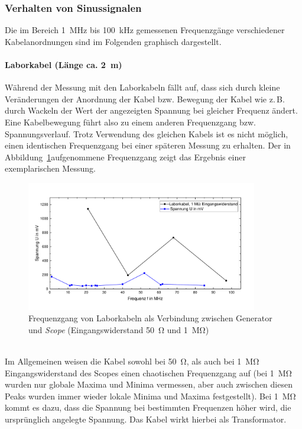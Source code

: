 \documentclass[a4paper,twoside,final]{article}
\begin{document}
\subsubsection{Verhalten von Sinussignalen}
Die im Bereich \SI{1}{\mega\hertz} bis \SI{100}{\kilo\hertz} gemessenen Frequenzgänge verschiedener Kabelanordnungen sind im Folgenden graphisch dargestellt.
\paragraph{Laborkabel (Länge ca. \SI{2}{\metre})}
Während der Messung mit den Laborkabeln fällt auf, dass sich durch kleine Veränderungen der Anordnung der Kabel bzw. Bewegung der Kabel wie z.\,B. durch Wackeln der Wert der angezeigten Spannung bei gleicher Frequenz ändert. Eine Kabelbewegung führt also zu einem anderen Frequenzgang bzw. Spannungsverlauf. Trotz Verwendung des gleichen Kabels ist es nicht möglich, einen identischen Frequenzgang bei einer späteren Messung zu erhalten. Der in Abbildung~\ref{fig:Frequenzgang_Laborkabel}aufgenommene Frequenzgang zeigt das Ergebnis einer exemplarischen Messung.
\begin{figure}[htp]
    \centering
        \vspace{-0.5cm}
        \includegraphics[width=0.9\textwidth]{Bilder/Laborkabel_50_1MOhm.pdf}
        \vspace{-0.25cm}
    \caption{Frequenzgang von Laborkabeln als Verbindung zwischen Generator und \textit{Scope} (Eingangswiderstand \SI{50}{\ohm} und \SI{1}{\mega\ohm}) }
    \label{fig:Frequenzgang_Laborkabel}
\end{figure}\\
Im Allgemeinen weisen die Kabel sowohl bei \SI{50}{\ohm}, als auch bei \SI{1}{\mega\ohm} Eingangswiderstand des Scopes einen chaotischen Frequenzgang auf (bei \SI{1}{\mega\ohm} wurden nur globale Maxima und Minima vermessen, aber auch zwischen diesen Peaks wurden immer wieder lokale Minima und Maxima festgestellt). Bei \SI{1}{\mega\ohm} kommt es dazu, dass die Spannung bei bestimmten Frequenzen höher wird, die ursprünglich angelegte Spannung. Das Kabel wirkt hierbei als Transformator.
\end{document}
